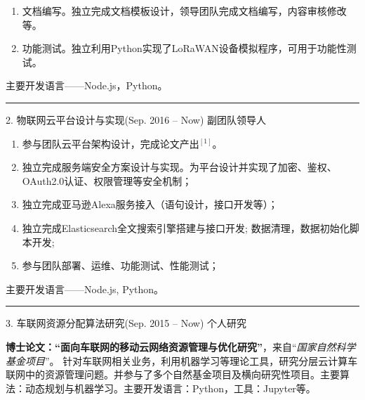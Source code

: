 \documentclass[10pt]{article} %
\begin{document}
\begin{paracol}{2}
{\begin{enumerate}
		\item 文档编写。独立完成文档模板设计，领导团队完成文档编写，内容审核修改等。
		
		\item 功能测试。独立利用Python实现了LoRaWAN\texttrademark 设备模拟程序，可用于功能性测试。
	\end{enumerate}
	主要开发语言——Node.js，Python。}  %
	\par\noindent\rule{0.53\textwidth}{0.4pt}
	
	\chsworkposition{} %
	{} %
	{2. 物联网云平台设计与实现(Sep. 2016 -- Now)} %
	{ 副团队领导人} %
	{\begin{enumerate}
		\item 参与团队云平台架构设计，完成论文产出$^{[1]}$。
		\item 独立完成服务端安全方案设计与实现。为平台设计并实现了加密、鉴权、OAuth2.0认证、权限管理等安全机制；
		\item 独立完成亚马逊\faAmazon Alexa服务接入（语句设计，接口开发等）；
		\item 独立完成Elasticsearch全文搜索引擎搭建与接口开发; 数据清理，数据初始化脚本开发;
		\item 参与团队部署、运维、功能测试、性能测试；
		\end{enumerate}
	主要开发语言——Node.js, Python。}  %
		
	\par\noindent\rule{0.53\textwidth}{0.4pt}

	
	\chsworkposition{} %
	{} %
	{3. 车联网资源分配算法研究(Sep. 2015 -- Now)} %
	{ 个人研究}\\ %
	{\raggedright\textbf{博士论文：``面向车联网的移动云网络资源管理与优化研究''}，来自``\textit{国家自然科学基金项目}''。
	针对车联网相关业务，利用机器学习等理论工具，研究分层云计算车联网中的资源管理问题。并参与了多个自然基金项目及横向研究性项目。主要算法：动态规划与机器学习。主要开发语言：Python，工具：Jupyter等。} %
	
	
	

\end{paracol}
\end{document}
